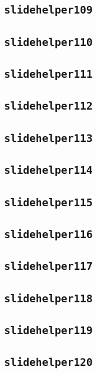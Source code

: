 \subsection{\texttt{slidehelper109}}
\newpage
\subsection{\texttt{slidehelper110}}
\newpage
\subsection{\texttt{slidehelper111}}
\newpage
\subsection{\texttt{slidehelper112}}
\newpage
\subsection{\texttt{slidehelper113}}
\newpage
\subsection{\texttt{slidehelper114}}
\newpage
\subsection{\texttt{slidehelper115}}
\newpage
\subsection{\texttt{slidehelper116}}
\newpage
\subsection{\texttt{slidehelper117}}
\newpage
\subsection{\texttt{slidehelper118}}
\newpage
\subsection{\texttt{slidehelper119}}
\newpage
\subsection{\texttt{slidehelper120}}
\newpage
